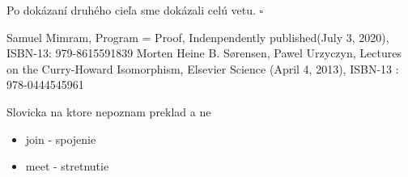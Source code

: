 \documentclass[a4paper,10pt,oneside]{report}%
\begin{document}
Po dokázaní druhého cieľa sme dokázali celú vetu. $\square$

\begin{thebibliography}{xx}
     Samuel Mimram, Program = Proof, Indenpendently published(July 3, 2020), ISBN-13: 979-8615591839
     Morten Heine B. Sørensen, Pawel Urzyczyn, Lectures on the Curry-Howard Isomorphism,
        Elsevier Science (April 4, 2013),  ISBN-13 : 978-0444545961
    \bibitem{}
\end{thebibliography}

Slovicka na ktore nepoznam preklad a ne
\begin{itemize}
    \item join - spojenie
    \item meet - stretnutie
\end{itemize}
\end{document}
